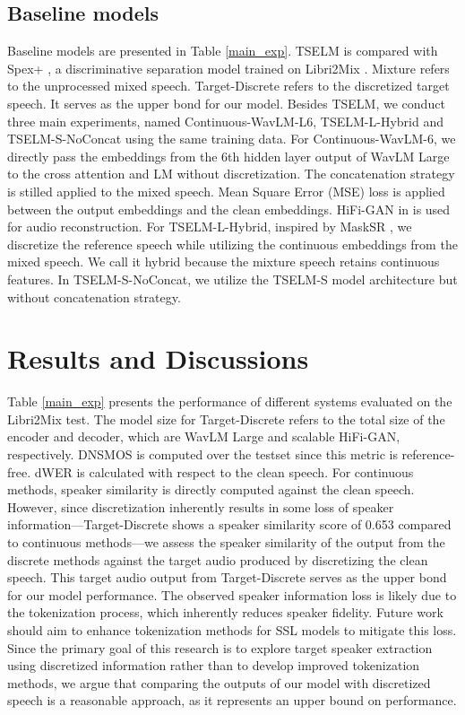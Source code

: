 \documentclass[conference]{IEEEtran}
\begin{document}
\subsection{Baseline models}
Baseline models are presented in Table \ref{main_exp}. 
TSELM is compared with Spex+ \cite{spex_plus}, a discriminative separation model trained on Libri2Mix \cite{librimix}. 
Mixture refers to the unprocessed mixed speech. 
Target-Discrete refers to the discretized target speech. It serves as the upper bond for our model.  Besides TSELM, we conduct three main experiments, named
 Continuous-WavLM-L6, TSELM-L-Hybrid and TSELM-S-NoConcat using the same training data. 
For Continuous-WavLM-6, we directly
pass the embeddings from the 6th hidden layer output of WavLM Large to the cross attention  
and LM without discretization. 
The concatenation strategy is stilled applied to the mixed speech. Mean Square Error (MSE) loss is applied between the output embeddings and the clean 
embeddings. HiFi-GAN in \cite{knn_vc} is used for audio reconstruction. For 
TSELM-L-Hybrid, inspired by MaskSR \cite{mask_sr}, we discretize the reference 
speech while utilizing the continuous embeddings from the mixed speech. We call 
it hybrid because the mixture speech retains continuous features. In TSELM-S-NoConcat, we utilize the TSELM-S model architecture but without concatenation strategy. 

\section{Results and Discussions}
Table \ref{main_exp} presents the performance of different systems evaluated on the Libri2Mix test.
The model size for Target-Discrete refers to the total size of the encoder and 
decoder, which are WavLM Large and scalable HiFi-GAN, respectively. DNSMOS is computed over the 
testset since this metric is reference-free. dWER is calculated with respect to the clean speech. 
For continuous methods, speaker similarity is directly computed against the clean speech. 
However, since discretization inherently results in some loss of speaker information—Target-Discrete shows a speaker similarity score of 0.653 compared to continuous methods—we assess the speaker similarity of the output from the discrete methods against the target audio produced by discretizing the clean speech. 
This target audio output from Target-Discrete serves as the upper bond for our model performance.
The observed speaker information loss is likely due to the tokenization process, which inherently reduces speaker fidelity. Future work should aim to enhance tokenization methods for SSL models to mitigate this loss. Since the primary goal of this research is to explore target speaker extraction using discretized information rather than to develop improved tokenization methods, we argue that comparing the outputs of our model with discretized speech is a reasonable approach, as it represents an upper bound on performance.
\end{document}
